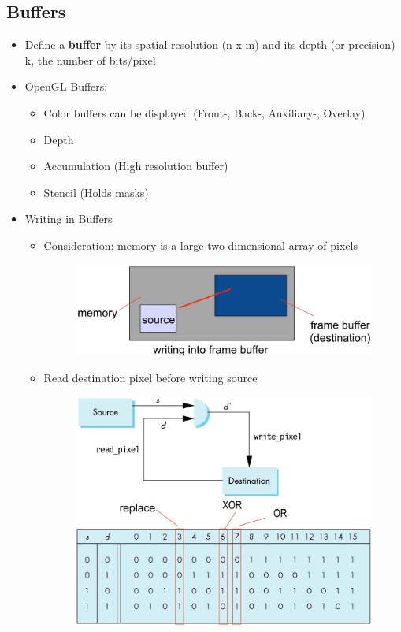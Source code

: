 \documentclass[11pt,a4paper]{article}
\begin{document}
	\subsection{Buffers}
		\begin{itemize}
			\item Define a \textbf{buffer} by its spatial resolution (n x m) and its depth (or precision) k, the number of bits/pixel
			\item OpenGL Buffers:
				\begin{itemize}
					\item Color buffers can be displayed (Front-, Back-, Auxiliary-, Overlay)
					\item Depth
					\item Accumulation (High resolution buffer)
					\item Stencil (Holds masks)
				\end{itemize}
			\item Writing in Buffers
				\begin{itemize}
					\item Consideration: memory is a large two-dimensional array of pixels
					\begin{figure}[h]
						\hspace{2.0cm}
						\includegraphics[scale=0.4]{pictures/WriteBuffer.jpg}
					\end{figure}
					\item Read destination pixel before writing source 
					\begin{figure}[h]
						\hspace{2.0cm}
						\vspace{-0.6cm}
						\includegraphics[scale=0.4]{pictures/WritingBuffer.jpg}

\end{figure}
\end{itemize}
\end{itemize}
\end{document}
